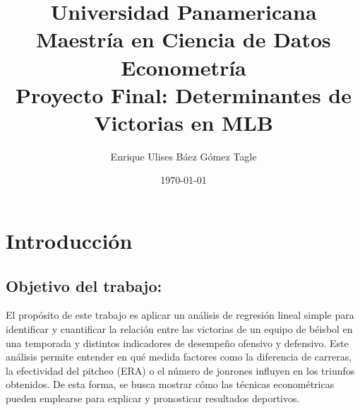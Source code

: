 \documentclass[10pt]{article}
\title{Universidad Panamericana \\ Maestría en Ciencia de Datos 
\\ Econometría \\ \vspace{0.5cm} 
Proyecto Final: Determinantes de Victorias en MLB
}
\author{Enrique Ulises Báez Gómez Tagle
}
\date{\today}
\begin{document}
\maketitle

\tableofcontents

\newpage
\section{Introducción}
\subsection{Objetivo del trabajo:}
El propósito de este trabajo es aplicar un análisis de regresión lineal simple para identificar y cuantificar la relación entre las victorias de un equipo de béisbol en una temporada y distintos indicadores de desempeño ofensivo y defensivo. Este análisis permite entender en qué medida factores como la diferencia de carreras, la efectividad del pitcheo (ERA) o el número de jonrones influyen en los triunfos obtenidos. De esta forma, se busca mostrar cómo las técnicas econométricas pueden emplearse para explicar y pronosticar resultados deportivos.
\end{document}
